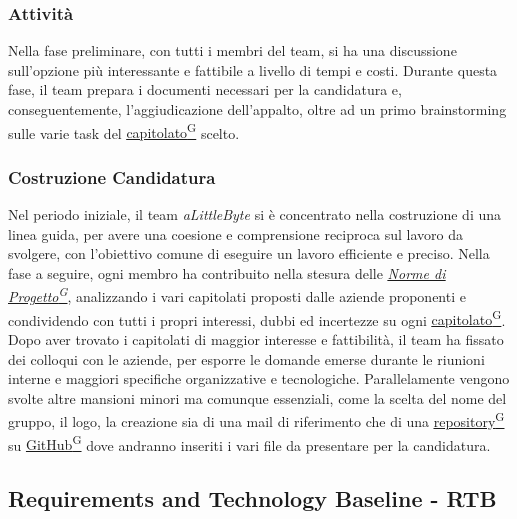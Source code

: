 \documentclass[a4paper,12pt]{article}
\providecommand{\glslink}[2]{\href{https://alittlebyte-19.github.io/Documentazione/glossario.html\#gls-#1}{\underline{#2}\textsuperscript{\scriptsize G}}}
\begin{document}
\subsubsection{Attività}
\label{sec:prertb_attivita}
Nella fase preliminare, con tutti i membri del team, si ha una discussione sull'opzione più interessante e fattibile a livello di tempi e costi.
Durante questa fase, il team prepara i documenti necessari per la candidatura e, conseguentemente, l'aggiudicazione dell'appalto, oltre ad un primo brainstorming sulle varie
task del \glslink{capitolato}{capitolato} scelto.
\subsubsection{Costruzione Candidatura}
\label{sec:costruzione_candidatura}
Nel periodo iniziale, il team \textit{aLittleByte} si è concentrato nella costruzione di una linea guida, per avere una coesione e comprensione reciproca sul lavoro da svolgere,
con l'obiettivo comune di eseguire un lavoro efficiente e preciso.
Nella fase a seguire, ogni membro ha contribuito nella stesura delle \textit{\glslink{norme-di-progetto}{Norme di Progetto}}, analizzando i vari capitolati proposti dalle aziende proponenti e condividendo
con tutti i propri interessi, dubbi ed incertezze su ogni \glslink{capitolato}{capitolato}. Dopo aver trovato i capitolati di maggior interesse e fattibilità, il team ha fissato dei colloqui con le aziende, per esporre le domande emerse durante le riunioni interne e maggiori specifiche organizzative e tecnologiche.
Parallelamente vengono svolte altre mansioni minori ma comunque essenziali, come la scelta del nome del gruppo, il logo, la creazione sia di una mail di riferimento che di una \glslink{repository}{repository} su
\glslink{github}{GitHub} dove andranno inseriti i vari file da presentare per la candidatura.

\subsection{Requirements and Technology Baseline - RTB}
\label{sec:rtb-requirements-and-technology-baseline}
\end{document}

